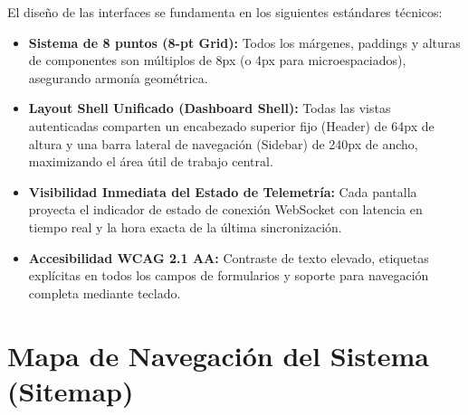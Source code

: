 \documentclass[12pt,a4paper]{report}
\begin{document}
El diseño de las interfaces se fundamenta en los siguientes estándares técnicos:
\begin{itemize}
  \item \textbf{Sistema de 8 puntos (8-pt Grid):} Todos los márgenes, paddings y alturas de componentes son múltiplos de 8px (o 4px para microespaciados), asegurando armonía geométrica.
  \item \textbf{Layout Shell Unificado (Dashboard Shell):} Todas las vistas autenticadas comparten un encabezado superior fijo (Header) de 64px de altura y una barra lateral de navegación (Sidebar) de 240px de ancho, maximizando el área útil de trabajo central.
  \item \textbf{Visibilidad Inmediata del Estado de Telemetría:} Cada pantalla proyecta el indicador de estado de conexión WebSocket con latencia en tiempo real y la hora exacta de la última sincronización.
  \item \textbf{Accesibilidad WCAG 2.1 AA:} Contraste de texto elevado, etiquetas explícitas en todos los campos de formularios y soporte para navegación completa mediante teclado.
\end{itemize}

\section{Mapa de Navegación del Sistema (Sitemap)}
\end{document}
